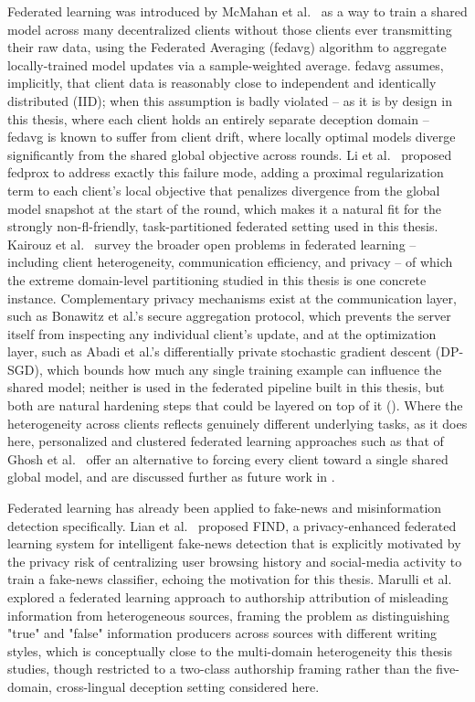 Federated learning was introduced by McMahan et al.\ \cite{mcmahan2017communication} as a way to train a shared model across many decentralized clients without those clients ever transmitting their raw data, using the Federated Averaging (\gls{fedavg}) algorithm to aggregate locally-trained model updates via a sample-weighted average. \gls{fedavg} assumes, implicitly, that client data is reasonably close to independent and identically distributed (IID); when this assumption is badly violated -- as it is by design in this thesis, where each client holds an entirely separate deception domain -- \gls{fedavg} is known to suffer from client drift, where locally optimal models diverge significantly from the shared global objective across rounds. Li et al.\ \cite{li2020federated} proposed \gls{fedprox} to address exactly this failure mode, adding a proximal regularization term to each client's local objective that penalizes divergence from the global model snapshot at the start of the round, which makes it a natural fit for the strongly non-\gls{fl}-friendly, task-partitioned federated setting used in this thesis. Kairouz et al.\ \cite{kairouz2021advances} survey the broader open problems in federated learning -- including client heterogeneity, communication efficiency, and privacy -- of which the extreme domain-level partitioning studied in this thesis is one concrete instance. Complementary privacy mechanisms exist at the communication layer, such as Bonawitz et al.'s \cite{bonawitz2017practical} secure aggregation protocol, which prevents the server itself from inspecting any individual client's update, and at the optimization layer, such as Abadi et al.'s \cite{abadi2016deep} differentially private stochastic gradient descent (DP-SGD), which bounds how much any single training example can influence the shared model; neither is used in the federated pipeline built in this thesis, but both are natural hardening steps that could be layered on top of it (). Where the heterogeneity across clients reflects genuinely different underlying tasks, as it does here, personalized and clustered federated learning approaches such as that of Ghosh et al.\ \cite{ghosh2020efficient} offer an alternative to forcing every client toward a single shared global model, and are discussed further as future work in .

Federated learning has already been applied to fake-news and misinformation detection specifically. Lian et al.\ \cite{lian2024find} proposed FIND, a privacy-enhanced federated learning system for intelligent fake-news detection that is explicitly motivated by the privacy risk of centralizing user browsing history and social-media activity to train a fake-news classifier, echoing the motivation for this thesis. Marulli et al.\ \cite{marulli2021exploring} explored a federated learning approach to authorship attribution of misleading information from heterogeneous sources, framing the problem as distinguishing "true" and "false" information producers across sources with different writing styles, which is conceptually close to the multi-domain heterogeneity this thesis studies, though restricted to a two-class authorship framing rather than the five-domain, cross-lingual deception setting considered here.

